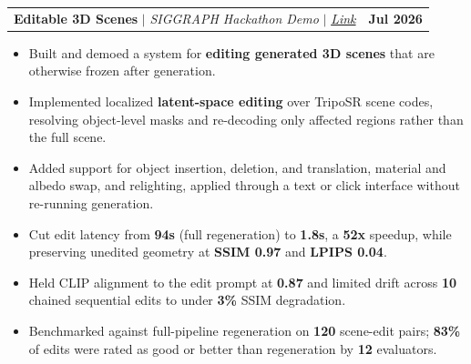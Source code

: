 \documentclass[letterpaper,10pt]{article}
\makeatletter
\newcommand{\todo}[1]{{\color{red}\textbf{[#1]}}}
\newcommand{\resumeItem}[1]{\item{{#1 \vspace{-3pt}}}}
\newcommand{\titleItem}[1]{\textbf{#1}}
\newcommand{\resumeProjectHeading}[2]{
    \item
    \begin{tabular*}{0.97\textwidth}{l@{\extracolsep{\fill}}r}
      #1 & #2 \\
    \end{tabular*}\vspace{-8pt}
}
\newcommand{\resumeItemListStart}{\begin{itemize}}
\newcommand{\resumeItemListEnd}{\end{itemize}\vspace{-7pt}}
\makeatother
\begin{document}

    \vspace{1mm}
    \resumeProjectHeading
      {\titleItem{Editable 3D Scenes} $|$ \emph{SIGGRAPH Hackathon Demo} $|$ \emph{\href{https://www.youtube.com/watch?v=c6djgtN2Pa0}{Link}}}{\textbf{Jul 2026}}
      \resumeItemListStart
      \vspace{1mm}
       \resumeItem{Built and demoed a system for \textbf{editing generated 3D scenes} that are otherwise frozen after generation.}
        \resumeItem{Implemented localized \textbf{latent-space editing} over TripoSR scene codes, resolving object-level masks and re-decoding only affected regions rather than the full scene.}
        \resumeItem{Added support for object insertion, deletion, and translation, material and albedo swap, and relighting, applied through a text or click interface without re-running generation.}
        \resumeItem{Cut edit latency from \textbf{94s} (full regeneration) to \textbf{1.8s}, a \textbf{52x} speedup, while preserving unedited geometry at \textbf{SSIM 0.97} and \textbf{LPIPS 0.04}.}
        \resumeItem{Held CLIP alignment to the edit prompt at \textbf{0.87} and limited drift across \textbf{10} chained sequential edits to under \textbf{3\%} SSIM degradation.}
        \resumeItem{Benchmarked against full-pipeline regeneration on \textbf{120} scene-edit pairs; \textbf{83\%} of edits were rated as good or better than regeneration by \textbf{12} evaluators.}
      \resumeItemListEnd

    \vspace{1mm}
\end{document}
